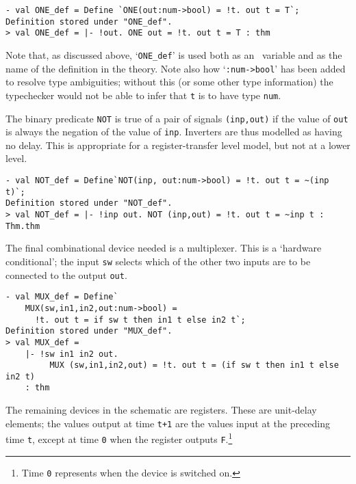 \begin{session}
\begin{verbatim}
- val ONE_def = Define `ONE(out:num->bool) = !t. out t = T`;
Definition stored under "ONE_def".
> val ONE_def = |- !out. ONE out = !t. out t = T : thm
\end{verbatim}
\end{session}

\noindent Note that, as discussed above, `{\small\verb|ONE_def|}'  is used both
as an \ML\ variable and as the name of the definition in the theory.
Note also how `{\small\verb|:num->bool|}' has been added to resolve
type ambiguities; without this (or some other type information) the
typechecker would not be able to infer that {\small\tt t} is to have
type {\small\tt num}.

The binary predicate {\small\verb|NOT|} is true of a pair of signals
{\small\verb|(inp,out)|} if the value of {\small\verb|out|} is always
the negation of the value of {\small\verb|inp|}. Inverters are thus
modelled as having no delay. This is appropriate for a
register-transfer level model, but not at a lower level.

\begin{session}
\begin{verbatim}
- val NOT_def = Define`NOT(inp, out:num->bool) = !t. out t = ~(inp t)`;
Definition stored under "NOT_def".
> val NOT_def = |- !inp out. NOT (inp,out) = !t. out t = ~inp t : Thm.thm
\end{verbatim}
\end{session}

\noindent The final combinational device needed is a multiplexer.
This is a `hardware conditional'; the input
{\small\verb|sw|} selects which of the other
two inputs are to be connected to the output {\small\verb|out|}.

\begin{session}
\begin{verbatim}
- val MUX_def = Define`
    MUX(sw,in1,in2,out:num->bool) =
      !t. out t = if sw t then in1 t else in2 t`;
Definition stored under "MUX_def".
> val MUX_def =
    |- !sw in1 in2 out.
         MUX (sw,in1,in2,out) = !t. out t = (if sw t then in1 t else in2 t)
    : thm
\end{verbatim}
\end{session}

The remaining devices in the schematic are registers.  These are
unit-delay elements; the values output at time {\small\verb|t+1|} are
the values input at the preceding time {\small\verb|t|}, except at
time {\small\verb|0|} when the register outputs
{\small\verb|F|}.\footnote{Time {\tt {\small 0}} represents when the
  device is switched on.}

